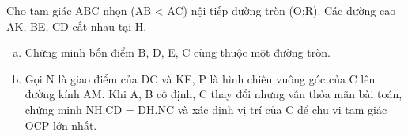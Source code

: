 \begin{ex}
	Cho tam giác ABC nhọn (AB < AC) nội tiếp đường tròn (O;R). Các đường cao AK, BE, CD cắt nhau tại H.
	\begin{enumerate}[a)]
		\item Chứng minh bốn điểm B, D, E, C cùng thuộc một đường tròn.
		\item Gọi N là giao điểm của DC và KE, P là hình chiếu vuông góc của C lên đường kính AM. Khi A, B cố định, C thay đổi nhưng vẫn thỏa mãn bài toán, chứng minh NH.CD = DH.NC và xác định vị trí của C để chu vi tam giác OCP lớn nhất.
	\end{enumerate}
\end{ex}
